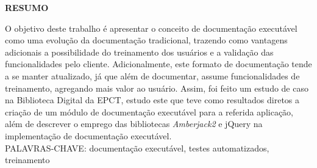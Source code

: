 \begin{center}
\textbf{RESUMO}
\end{center}
\singlespacing

\noindent O objetivo deste trabalho é apresentar o conceito de documentação executável como uma evolução da documentação tradicional, trazendo como vantagens adicionais a possibilidade do treinamento dos usuários e a validação das funcionalidades pelo cliente. Adicionalmente, este formato de documentação tende a se manter atualizado, já que além de documentar, assume funcionalidades de treinamento, agregando mais valor ao usuário. Assim, foi feito um estudo de caso na Biblioteca Digital da EPCT, estudo este que teve como resultados diretos a criação de um módulo de documentação executável para a referida aplicação, além de descrever o emprego das bibliotecas \textit{Amberjack2} e jQuery na implementação de documentação executável. \\

\noindent PALAVRAS-CHAVE: documentação executável, testes automatizados, treinamento
